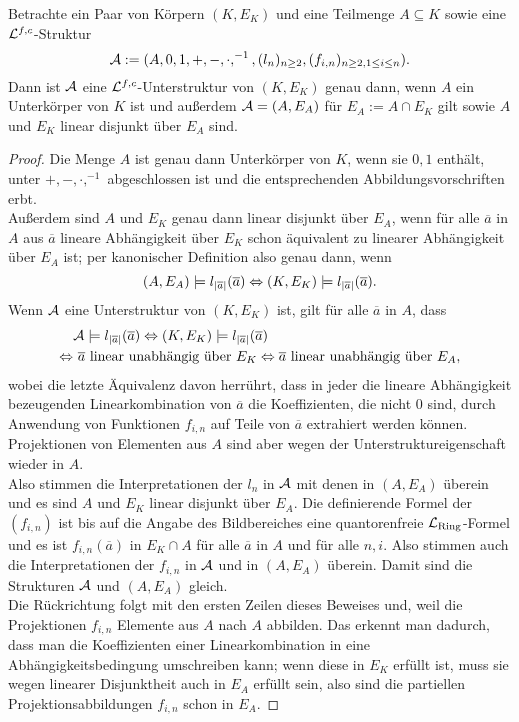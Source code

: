     \begin{lemma}
    	Betrachte ein Paar von Körpern $(K,E_K)$ und eine Teilmenge ${A\subseteq K}$ sowie eine $\mathcal{L}^{f,c}$-Struktur $$\mathcal{A}:=(A,0,1,+,-,\cdot,^{-1},(l_n)_{n\geq2},(f_{i,n})_{n\geq2,1\leq i\leq n}).$$ Dann ist $\mathcal{A}$ eine $\mathcal{L}^{f,c}$-Unterstruktur von $(K,E_K)$ genau dann, wenn $A$ ein Unterkörper von $K$ ist und außerdem $\mathcal{A}=(A,E_A)$ für $E_A:=A\cap E_K$ gilt sowie $A$ und $E_K$ linear disjunkt über $E_A$ sind.
    \end{lemma}
    \begin{proof}
    	Die Menge $A$ ist genau dann Unterkörper von $K$, wenn sie $0,1$ enthält, unter $+,-,\cdot,^{-1}$ abgeschlossen ist und die entsprechenden Abbildungsvorschriften erbt.\\
    	Außerdem sind $A$ und $E_K$ genau dann linear disjunkt über $E_A$, wenn für alle $\overline{a}$ in $A$ aus $\overline{a}$ lineare Abhängigkeit über $E_K$ schon äquivalent zu linearer Abhängigkeit über $E_A$ ist; per kanonischer Definition also genau dann, wenn $$(A,E_A)\models l_{{\left| \overline{a} \right|}}(\overline{a}) \Leftrightarrow (K,E_K)\models l_{{\left| \overline{a} \right|}}(\overline{a}).$$\newpage
    	Wenn $\mathcal{A}$ eine Unterstruktur von $(K,E_K)$ ist, gilt für alle $\overline{a}$ in $A$, dass
    	\begin{align*}
    	&\mathcal{A}\models l_{{\left| \overline{a} \right|}}(\overline{a})\Leftrightarrow(K,E_K)\models l_{{\left| \overline{a} \right|}}(\overline{a})\\
    	\Leftrightarrow&\ \overline{a}\text{ linear unabhängig über }E_K\Leftrightarrow\overline{a}\text{ linear unabhängig über }E_A,
    	\end{align*}
    	wobei die letzte Äquivalenz davon herrührt, dass in jeder die lineare Abhängigkeit bezeugenden Linearkombination von $\overline{a}$ die Koeffizienten, die nicht $0$ sind, durch Anwendung von Funktionen $f_{i,n}$ auf Teile von $\overline{a}$ extrahiert werden können. Projektionen von Elementen aus $A$ sind aber wegen der Unterstruktureigenschaft wieder in $A$.\\
    	Also stimmen die Interpretationen der $l_n$ in $\mathcal{A}$ mit denen in $(A,E_A)$ überein und es sind $A$ und $E_K$ linear disjunkt über $E_A$. Die definierende Formel der $(f_{i,n})$ ist bis auf die Angabe des Bildbereiches eine quantorenfreie $\mathcal{L}_{\text{Ring}}$-Formel und es ist $f_{i,n}(\overline{a})$ in $E_K\cap A$ für alle $\overline{a}$ in $A$ und für alle $n,i$. Also stimmen auch die Interpretationen der $f_{i,n}$ in $\mathcal{A}$ und in $(A,E_A)$ überein. Damit sind die Strukturen $\mathcal{A}$ und $(A,E_A)$ gleich.\\
    	Die Rückrichtung folgt mit den ersten Zeilen dieses Beweises und, weil die Projektionen $f_{i,n}$ Elemente aus $A$ nach $A$ abbilden. Das erkennt man dadurch, dass man die Koeffizienten einer Linearkombination in eine Abhängigkeitsbedingung umschreiben kann; wenn diese in $E_K$ erfüllt ist, muss sie wegen linearer Disjunktheit auch in $E_A$ erfüllt sein, also sind die partiellen Projektionsabbildungen $f_{i,n}$ schon in $E_A$.
    \end{proof}
    
